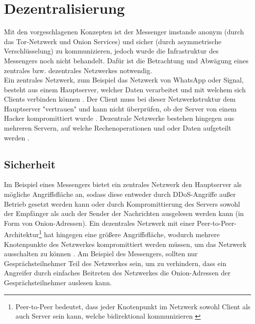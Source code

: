 \documentclass[a4paper,ngerman, headheight=28pt,12pt]{scrartcl}
\newcommand{\vcite}[1]{\cite[vgl.][]{#1}}
\begin{document}
\section{Dezentralisierung}
Mit den vorgeschlagenen Konzepten ist der Messenger imstande anonym (durch das Tor-Netzwerk und Onion Services) und sicher (durch asymmetrische Verschlüsselung) zu kommunizieren, jedoch wurde die Infrastruktur des Messengers noch nicht behandelt. Dafür ist die Betrachtung und Abwägung eines zentrales bzw. dezentrales Netzwerkes notwendig. \\
Ein zentrales Netzwerk, zum Beispiel das Netzwerk von WhatsApp oder Signal, besteht aus einem Hauptserver, welcher Daten verarbeitet und mit welchem sich Clients verbinden können \vcite{WhatsappCentralized,SignalCentralized, CentralizedDefinition}.
Der Client muss bei dieser Netzwerkstruktur dem Hauptserver "vertrauen" und kann nicht überprüfen, ob der Server von einem Hacker kompromittiert wurde \vcite{MessagingNetwork}. Dezentrale Netzwerke bestehen hingegen aus mehreren Servern, auf welche Rechenoperationen und oder Daten aufgeteilt werden \vcite{DecentralizedDefinition}.


\subsection{Sicherheit}
Im Beispiel eines Messengers bietet ein zentrales Netzwerk den Hauptserver als mögliche Angriffsfläche an, sodass diese entweder durch DDoS-Angriffe außer Betrieb gesetzt werden kann oder durch Kompromittierung des Servers sowohl der Empfänger als auch der Sender der Nachrichten ausgelesen werden kann (in Form von Onion-Adressen)\vcite{BSI-DDoS}.
Ein dezentrales Netzwerk mit einer Peer-to-Peer-Architektur\footnote{Peer-to-Peer bedeutet, dass jeder Knotenpunkt im Netzwerk sowohl Client als auch Server sein kann, welche bidirektional kommunizieren \vcite{PeerToPeerDef}} hat hingegen eine größere Angriffsfläche, wodurch mehrere Knotenpunkte des Netzwerkes kompromittiert werden müssen, um das Netzwerk ausschalten zu können \vcite{GeeksCenralizeDecentralized}.
Am Beispiel des Messengers, sollten nur Gesprächsteilnehmer Teil des Netzwerkes sein, um zu verhindern, dass ein Angreifer durch einfaches Beitreten des Netzwerkes die Onion-Adressen der Gesprächsteilnehmer auslesen kann.
\end{document}
